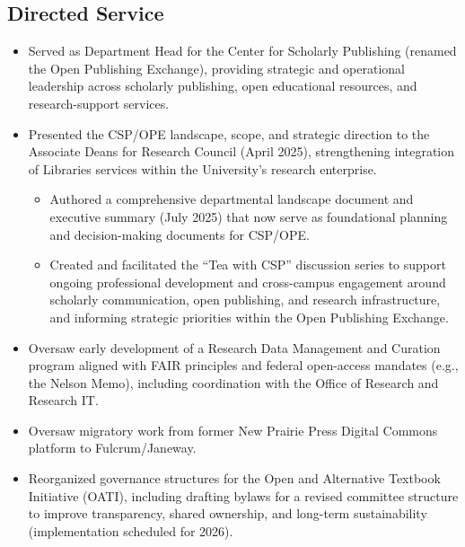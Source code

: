 \ExampleNote

\subsection*{Directed Service}

\begin{itemize}
  \item Served as Department Head for the Center for Scholarly Publishing (renamed the Open Publishing Exchange), providing strategic and operational leadership across scholarly publishing, open educational resources, and research-support services.

  \item Presented the CSP/OPE landscape, scope, and strategic direction to the Associate Deans for Research Council (April 2025), strengthening integration of Libraries services within the University’s research enterprise.
    \begin{itemize}
      \item Authored a comprehensive departmental landscape document and executive summary (July 2025) that now serve as foundational planning and decision-making documents for CSP/OPE.
      \item Created and facilitated the ``Tea with CSP'' discussion series to support ongoing professional development and cross-campus engagement around scholarly communication, open publishing, and research infrastructure, and informing strategic priorities within the Open Publishing Exchange.
    \end{itemize}

  \item Oversaw early development of a Research Data Management and Curation program aligned with FAIR principles and federal open-access mandates (e.g., the Nelson Memo), including coordination with the Office of Research and Research IT.

  \item Oversaw migratory work from former New Prairie Press Digital Commons platform to Fulcrum/Janeway.

  \item Reorganized governance structures for the Open and Alternative Textbook Initiative (OATI), including drafting bylaws for a revised committee structure to improve transparency, shared ownership, and long-term sustainability (implementation scheduled for 2026).


\end{itemize}
